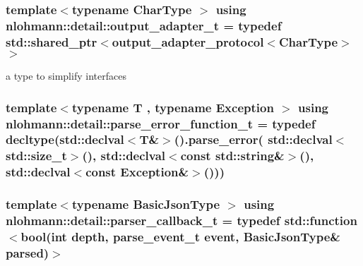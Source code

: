 \subsubsection[{\texorpdfstring{output\+\_\+adapter\+\_\+t}{output_adapter_t}}]{\setlength{\rightskip}{0pt plus 5cm}template$<$typename Char\+Type $>$ using {\bf nlohmann\+::detail\+::output\+\_\+adapter\+\_\+t} = typedef std\+::shared\+\_\+ptr$<${\bf output\+\_\+adapter\+\_\+protocol}$<$Char\+Type$>$$>$}\hypertarget{namespacenlohmann_1_1detail_a0fd8edff7729aa2dd92b070964bade2e}{}\label{namespacenlohmann_1_1detail_a0fd8edff7729aa2dd92b070964bade2e}


a type to simplify interfaces 

\subsubsection[{\texorpdfstring{parse\+\_\+error\+\_\+function\+\_\+t}{parse_error_function_t}}]{\setlength{\rightskip}{0pt plus 5cm}template$<$typename T , typename Exception $>$ using {\bf nlohmann\+::detail\+::parse\+\_\+error\+\_\+function\+\_\+t} = typedef decltype(std\+::declval$<$T\&$>$().{\bf parse\+\_\+error}( std\+::declval$<$std\+::size\+\_\+t$>$(), std\+::declval$<$const {\bf std\+::string}\&$>$(), std\+::declval$<$const Exception\&$>$()))}\hypertarget{namespacenlohmann_1_1detail_a264d4d58bc1fd82bcc7bf6bf73d6acad}{}\label{namespacenlohmann_1_1detail_a264d4d58bc1fd82bcc7bf6bf73d6acad}
\subsubsection[{\texorpdfstring{parser\+\_\+callback\+\_\+t}{parser_callback_t}}]{\setlength{\rightskip}{0pt plus 5cm}template$<$typename Basic\+Json\+Type $>$ using {\bf nlohmann\+::detail\+::parser\+\_\+callback\+\_\+t} = typedef std\+::function$<$bool(int depth, {\bf parse\+\_\+event\+\_\+t} event, Basic\+Json\+Type\& parsed)$>$}\hypertarget{namespacenlohmann_1_1detail_a9980144ad77e50ae944d1fe797ceec08}{}\label{namespacenlohmann_1_1detail_a9980144ad77e50ae944d1fe797ceec08}
